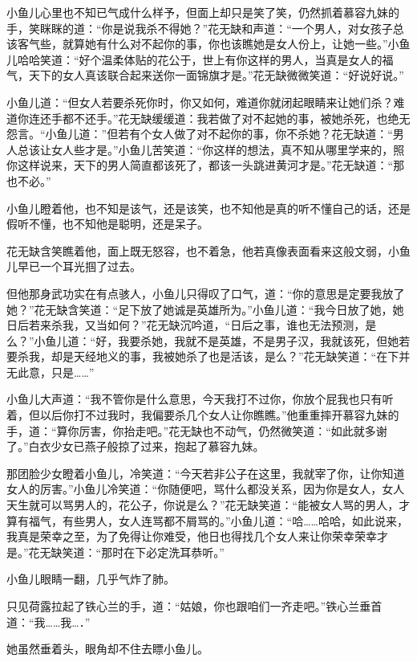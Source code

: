 \documentclass[12pt,oneside]{book}
\begin{document}
小鱼儿心里也不知已气成什么样予，但面上却只是笑了笑，仍然抓着慕容九妹的手，笑眯眯的道：``你是说我杀不得她？''花无缺和声道：``一个男人，对女孩子总该客气些，就算她有什么对不起你的事，你也该瞧她是女人份上，让她一些。''小鱼儿哈哈笑道：``好个温柔体贴的花公于，世上有你这样的男人，当真是女人的福气，天下的女人真该联合起来送你一面锦旗才是。''花无缺微微笑道：``好说好说。''

小鱼儿道：``但女人若要杀死你时，你又如何，难道你就闭起眼睛来让她们杀？难道你连还手都不还手。''花无缺缓缓道：我若做了对不起她的事，被她杀死，也绝无怨言。``小鱼儿道：''但若有个女人做了对不起你的事，你不杀她？花无缺道：``男人总该让女人些才是。''小鱼儿苦笑道：``你这样的想法，真不知从哪里学来的，照你这样说来，天下的男人简直都该死了，都该一头跳进黄河才是。''花无缺道：``那也不必。''

小鱼儿瞪着他，也不知是该气，还是该笑，也不知他是真的听不懂自己的话，还是假听不懂，也不知他是聪明，还是呆子。

花无缺含笑瞧着他，面上既无怒容，也不着急，他若真像表面看来这般文弱，小鱼儿早已一个耳光掴了过去。

但他那身武功实在有点骇人，小鱼儿只得叹了口气，道：``你的意思是定要我放了她？''花无缺含笑道：``足下放了她诚是英雄所为。''小鱼儿道：``我今日放了她，她日后若来杀我，又当如何？''花无缺沉吟道，``日后之事，谁也无法预测，是么？''小鱼儿道：``好，我要杀她，我就不是英雄，不是男子汉，我就该死，但她若要杀我，却是天经地义的事，我被她杀了也是活该，是么？''花无缺笑道：``在下并无此意，只是\ldots\ldots{}''

小鱼儿大声道：``我不管你是什么意思，今天我打不过你，你放个屁我也只有听着，但以后你打不过我时，我偏要杀几个女人让你瞧瞧。''他重重摔开慕容九妹的手，道：``算你厉害，你抬走吧。''花无缺也不动气，仍然微笑道：``如此就多谢了。''白衣少女已燕子般掠了过来，抱起了慕容九妹。

那团脸少女瞪着小鱼儿，冷笑道：``今天若非公子在这里，我就宰了你，让你知道女人的厉害。''小鱼儿冷笑道：``你随便吧，骂什么都没关系，因为你是女人，女人天生就可以骂男人的，花公子，你说是么？''花无缺笑道：``能被女人骂的男人，才算有福气，有些男人，女人连骂都不屑骂的。''小鱼儿道：``哈\ldots\ldots 哈哈，如此说来，我真是荣幸之至，为了免得让你难受，他日也得找几个女人来让你荣幸荣幸才是。''花无缺笑道：``那时在下必定洗耳恭听。''

小鱼儿眼睛一翻，几乎气炸了肺。

只见荷露拉起了铁心兰的手，道：``姑娘，你也跟咱们一齐走吧。''铁心兰垂首道：``我\ldots\ldots 我\ldots．''

她虽然垂着头，眼角却不住去瞟小鱼儿。
\end{document}
